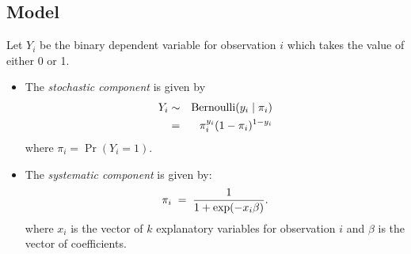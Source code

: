 \documentclass[letterpaper,10pt,english]{sphinxmanual}
\begin{document}
\subsection{Model}
\label{vignette:id8}
Let \(Y_i\) be the binary dependent variable for observation
\(i\) which takes the value of either 0 or 1.
\begin{itemize}
\item {} 
The \emph{stochastic component} is given by
\begin{gather}
\begin{split}\begin{aligned}
Y_i &\sim& \textrm{Bernoulli}(y_i \mid \pi_i) \\
    &=& \pi_i^{y_i} (1-\pi_i)^{1-y_i}\end{aligned}\end{split}\notag
\end{gather}
where \(\pi_i=\Pr(Y_i=1)\).

\item {} 
The \emph{systematic component} is given by:
\begin{gather}
\begin{split}\pi_i \; = \; \frac{1}{1 + \exp(-x_i \beta)}.\end{split}\notag
\end{gather}
where \(x_i\) is the vector of \(k\) explanatory variables
for observation \(i\) and \(\beta\) is the vector of
coefficients.

\end{itemize}
\end{document}
